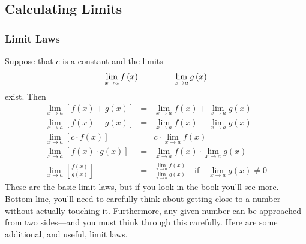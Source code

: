 \documentclass[12pt,addpoints, answers, fleqn]{exam}
\begin{document}
\subsection{Calculating Limits}


\subsubsection{Limit Laws}

Suppose that $c$ is a constant and the limits
\[
\mathop {\lim }\limits_{x \to a }  f \left( x \right) \qquad \mbox \qquad \mathop {\lim }\limits_{x \to a }  g \left( x \right)
\]
exist. Then
\begin{eqnarray*}
\mathop {\lim }\limits_{x \to a }  \left[ f \left( x \right) +   g \left( x \right) \right] &=& \mathop {\lim }\limits_{x \to a }  f \left( x \right) + \mathop {\lim }\limits_{x \to a }  g \left( x \right)\\
\mathop {\lim }\limits_{x \to a }  \left[ f \left( x \right) -   g \left( x \right) \right] &=& \mathop {\lim }\limits_{x \to a }  f \left( x \right) - \mathop {\lim }\limits_{x \to a }  g \left( x \right)\\
\mathop {\lim }\limits_{x \to a }  \left[ c \cdot f \left( x \right)  \right] &=& c \cdot \mathop  {\lim }\limits_{x \to a }  f \left( x \right)\\
\mathop {\lim }\limits_{x \to a }  \left[ f \left( x \right)  \cdot  g \left( x \right) \right] &=& \mathop {\lim }\limits_{x \to a }  f \left( x \right) \cdot \mathop {\lim }\limits_{x \to a }   g \left( x \right)\\
\mathop {\lim }\limits_{x \to a }  \left[ \frac{f \left( x \right)}{g \left( x \right)} \right] &=& \frac{\mathop {\lim }\limits_{x \to a }  f \left( x \right) }{ \mathop {\lim }\limits_{x \to a }   g \left( x \right)} \quad \mbox{if} \quad \mathop {\lim }\limits_{x \to a }  g \left( x \right) \neq 0
\end{eqnarray*}
These are the basic limit laws, but if you look in the book you'll see more. Bottom line, you'll need to carefully think about getting close to a number without actually touching it. Furthermore, any given number can be approached from two sides---and you must think through this carefully. Here are some additional, and useful, limit laws.
\end{document}
